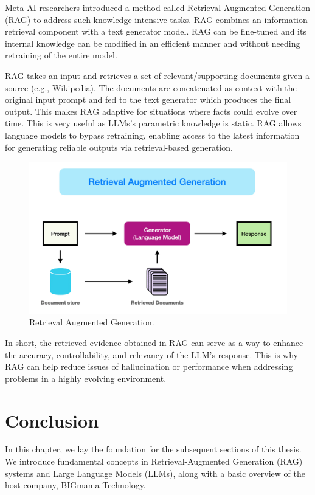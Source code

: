 Meta AI researchers introduced a method called Retrieval Augmented Generation (RAG) \cite{metaairag}  to address such knowledge-intensive tasks. RAG combines an information retrieval component with a text generator model. RAG can be fine-tuned and its internal knowledge can be modified in an efficient manner and without needing retraining of the entire model.

RAG takes an input and retrieves a set of relevant/supporting documents given a source (e.g., Wikipedia). The documents are concatenated as context with the original input prompt and fed to the text generator which produces the final output. This makes RAG adaptive for situations where facts could evolve over time. This is very useful as LLMs's parametric knowledge is static. RAG allows language models to bypass retraining, enabling access to the latest information for generating reliable outputs via retrieval-based generation.

\begin{figure}[!ht]
    \centering
    \includegraphics[width=\linewidth]{rag.png}
    \caption{Retrieval Augmented Generation.}
    \label{fig:rag}
\end{figure}

In short, the retrieved evidence obtained in RAG can serve as a way to enhance the accuracy, controllability, and relevancy of the LLM's response. This is why RAG can help reduce issues of hallucination or performance when addressing problems in a highly evolving environment.

\section{Conclusion}

In this chapter, we lay the foundation for the subsequent sections of this thesis. We introduce fundamental concepts in Retrieval-Augmented Generation (RAG) systems and Large Language Models (LLMs), along with a basic overview of the host company, BIGmama Technology.